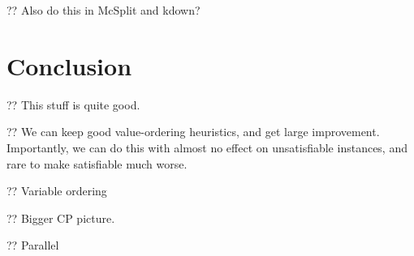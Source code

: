 \documentclass{article}
\begin{document}
?? Also do this in McSplit and kdown?

\section{Conclusion}

?? This stuff is quite good.

?? We can keep good value-ordering heuristics, and get large improvement. Importantly, we can do
this with almost no effect on unsatisfiable instances, and rare to make satisfiable much worse.

?? Variable ordering

?? Bigger CP picture.

?? Parallel



\end{document}
